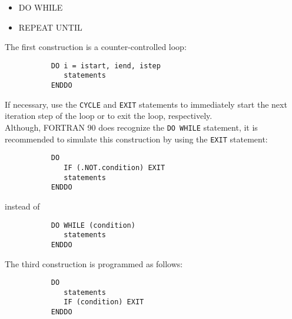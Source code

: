 \documentclass[12pt]{book}
\begin{document}
\begin{itemize}
\begin{itemize}
           \item DO WHILE
           \item REPEAT UNTIL
        \end{itemize}
        The first construction is a counter-controlled loop:
        \begin{verbatim}
           DO i = istart, iend, istep
              statements
           ENDDO
        \end{verbatim}
        If necessary, use the {\tt CYCLE} and {\tt EXIT} statements to immediately start the next iteration step of the
        loop or to exit the loop, respectively.
        \\[2ex]
        \noindent
        Although, FORTRAN 90 does recognize the {\tt DO WHILE} statement, it is recommended to simulate this
        construction by using the {\tt EXIT} statement:
        \begin{verbatim}
           DO
              IF (.NOT.condition) EXIT
              statements
           ENDDO
        \end{verbatim}
        instead of
        \begin{verbatim}
           DO WHILE (condition)
              statements
           ENDDO
        \end{verbatim}
        The third construction is programmed as follows:
        \begin{verbatim}
           DO
              statements
              IF (condition) EXIT
           ENDDO
        \end{verbatim}
\end{itemize}

 \label{ch:modul}
\end{document}
